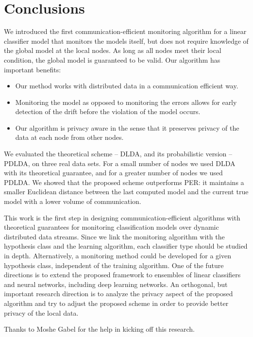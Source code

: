\section*{Conclusions}
We introduced the first communication-efficient monitoring algorithm for a linear classifier model that monitors the
models itself, but does not require knowledge of the global model at the local nodes.
As long as all nodes meet their local condition, the
global model is guaranteed to be valid. Our algorithm has important benefits:
\begin{itemize}
  \item Our method works with distributed data in a communication efficient way.
  \item Monitoring the model as opposed to monitoring the errors allows for early detection of the drift before the violation of the model occurs.
  \item Our algorithm is privacy aware in the sense that it preserves privacy of the data at each node from other nodes.
\end{itemize}

We evaluated the theoretical scheme -- DLDA,  and its probabilistic version -- PDLDA, on three real data sets.
For a small number of nodes we used DLDA with its theoretical guarantee, and for a greater number of nodes we used
PDLDA. We showed that the proposed scheme outperforms PER: it maintains a smaller Euclidean distance between
the last computed model and the current true model with a lower volume of communication.

This work is the first step in designing communication-efficient algorithms
with theoretical guarantees for monitoring classification models over dynamic distributed data
streams. 
Since we link the monitoring algorithm with the
hypothesis class and the learning algorithm, each classifier type should be
studied in depth.
Alternatively, a monitoring method could be developed for a given
hypothesis class, independent of the training algorithm.
One of the future directions is to extend the proposed framework to
ensembles of linear classifiers and neural networks, including deep learning networks.
An orthogonal, but important research direction is to analyze the
privacy aspect of the proposed algorithm and try to adjust the proposed
scheme in order to provide better privacy of the local data.


\begin{acknowledgements}
Thanks to Moshe Gabel for the help in kicking off this research.
\end{acknowledgements}

